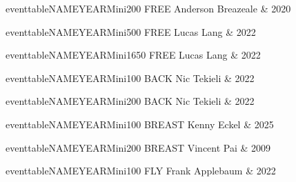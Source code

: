 \vspace{0.3cm}

\begin{minipage}[t]{0.44\textwidth}
\centering
eventtableNAMEYEARMini{200 FREE}{
Anderson Breazeale & 2020 \\
}
\end{minipage}\hfill
\begin{minipage}[t]{0.44\textwidth}
\centering
eventtableNAMEYEARMini{500 FREE}{
Lucas Lang & 2022 \\
}
\end{minipage}

\vspace{0.3cm}

\begin{minipage}[t]{0.44\textwidth}
\centering
eventtableNAMEYEARMini{1650 FREE}{
Lucas Lang & 2022 \\
}
\end{minipage}\hfill
\begin{minipage}[t]{0.44\textwidth}
\centering
eventtableNAMEYEARMini{100 BACK}{
Nic Tekieli & 2022 \\
}
\end{minipage}

\vspace{0.3cm}

\begin{minipage}[t]{0.44\textwidth}
\centering
eventtableNAMEYEARMini{200 BACK}{
Nic Tekieli & 2022 \\
}
\end{minipage}\hfill
\begin{minipage}[t]{0.44\textwidth}
\centering
eventtableNAMEYEARMini{100 BREAST}{
Kenny Eckel & 2025 \\
}
\end{minipage}

\vspace{0.3cm}

\begin{minipage}[t]{0.44\textwidth}
\centering
eventtableNAMEYEARMini{200 BREAST}{
Vincent Pai & 2009 \\
}
\end{minipage}\hfill
\begin{minipage}[t]{0.44\textwidth}
\centering
eventtableNAMEYEARMini{100 FLY}{
Frank Applebaum & 2022 \\
}
\end{minipage}

\vspace{0.3cm}

